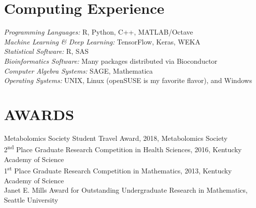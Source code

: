 {\section*{Computing Experience} 
\emph{Programming Languages:} R, Python, C++, MATLAB/Octave \\
\emph{Machine Learning \& Deep Learning:} TensorFlow, Keras, WEKA \\
\emph{Statistical Software:} R, SAS \\
\emph{Bioinformatics Software:} Many packages distributed via Bioconductor \\
\emph{Computer Algebra Systems:} SAGE, Mathematica \\ 
\emph{Operating Systems:} UNIX, Linux (openSUSE is my favorite flavor), and Windows

\section*{AWARDS}
Metabolomics Society Student Travel Award, 2018, Metabolomics Society\\

2\textsuperscript{nd} Place Graduate Research Competition in Health Sciences, 2016, Kentucky Academy of Science\\

1\textsuperscript{st} Place Graduate Research Competition in Mathematics, 2013, Kentucky Academy of Science\\

Janet E. Mills Award for Outstanding Undergraduate Research in Mathematics, Seattle University

}